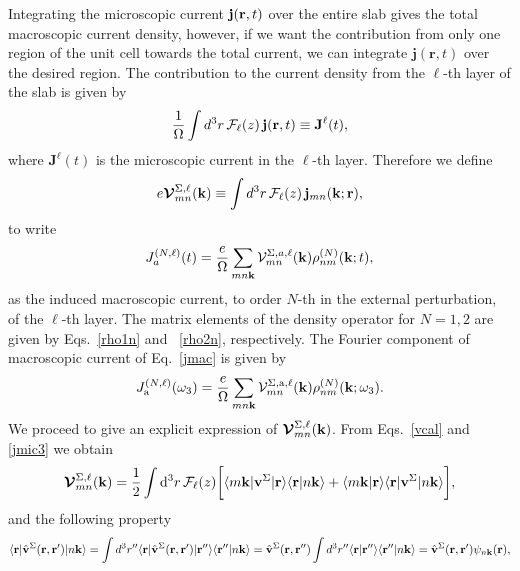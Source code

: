 \documentclass[floatfix,prb,aps,superscriptaddress,11pt,preprint]{revtex4}
\begin{document}
Integrating the microscopic current $\mathbf{j}(\mathbf{r},t)$ over
the entire slab gives the total macroscopic current density, 
 however, if we want the
contribution from only one region of the unit cell towards the total
current, we can integrate $\mathbf{j}({\mathbf r},t)$ over the
desired region. The contribution to the current density from the
$\ell$-th layer of the slab is given by
\begin{equation}\label{jsz}
\frac{1}{\Omega}\int d^3r\, {\mathbf{\cal F}}_\ell(z)\, \mathbf{j}(\mathbf{r},t)
 \equiv \mathbf{J}^{\ell}(t),
\end{equation}
where $\mathbf{J}^{\ell}(t)$ is the microscopic current  in the
$\ell$-th layer.
Therefore we define
\begin{equation}\label{vcal}
e{\boldsymbol{\mathcal{V}}}^{\Sigma,\ell}_{mn}(\mathbf{k})
\equiv
\int d^3r\, {\mathbf{\cal F}}_\ell(z)\,\mathbf{j}_{mn}({\mathbf{k}};\mathbf{r}),
\end{equation}
to write
\begin{equation}\label{jmac}
J_a^{(N,\ell)}(t)=\frac{e}{\Omega}
\sum_{mn\mathbf{k}}
\mathcal{V}^{\Sigma,a,\ell}_{mn}(\mathbf{k})
\rho^{(N)}_{nm}(\mathbf{k};t),
\end{equation}
as the induced macroscopic current, to order $N$-th in the external
perturbation, of the  $\ell$-th layer. The matrix elements of the
density operator for $N=1,2$ are given by Eqs.~\eqref{rho1n} and
~\eqref{rho2n}, respectively. 
The Fourier component of macroscopic current of Eq.~\eqref{jmac} is given by
\begin{equation}\label{jmac2}
J_{\mathrm{a}}^{(N,\ell)}(\omega_3)=\frac{e}{\Omega}
\sum_{mn\mathbf{k}}
{\mathbf{\cal V}}^{\Sigma,\mathrm{a},\ell}_{mn}(\mathbf{k})
\rho^{(N)}_{nm}(\mathbf{k};\omega_3)
.
\end{equation}
We proceed to give an explicit expression of
$\boldsymbol{\mathcal{\cal V}}^{\Sigma,\ell}_{mn}(\mathbf{k})$.
From
Eqs.~\eqref{vcal} and \eqref{jmic3} we obtain
\begin{equation}\label{intj}
{\boldsymbol{\mathcal{V}}}^{\Sigma,\ell}_{mn}({\mathbf k})=
\frac{1}{2}
\int \mathrm{d}^3 r\,
 {\mathbf{\cal F}}_\ell(z)
\bigg[
\langle m\mathbf{k}|\mathbf{v}^\Sigma | \mathbf{r}\rangle
\langle \mathbf{r} | n \mathbf k \rangle +
\langle m\mathbf{k} | \mathbf{r}\rangle
\langle \mathbf{r} | \mathbf{v}^\Sigma | n \mathbf k \rangle\bigg]
,
\end{equation}  
and the following property
\begin{equation}\label{nl.2}
\langle \mathbf{r} | \hat{\mathbf{v}}^\Sigma(\mathbf{r},\mathbf{r}')| n\mathbf{k} \rangle
=\int d^3 r'' \langle \mathbf{r} |\hat{\mathbf{v}}^\Sigma(\mathbf{r},\mathbf{r}')| \mathbf{r}'' \rangle
\langle {\mathbf{r}''} | {n\mathbf{k}} \rangle
=\hat{\mathbf{v}}^\Sigma(\mathbf{r},\mathbf{r}'')
\int d^3 r'' \langle {\mathbf{r}} | {\mathbf{r}''} \rangle
\langle {\mathbf{r}''} | {n\mathbf{k}} \rangle
=\hat{\mathbf{v}}^\Sigma(\mathbf{r},\mathbf{r}')
\psi_{n\mathbf{k}}(\mathbf{r})
,
\end{equation}
\end{document}
